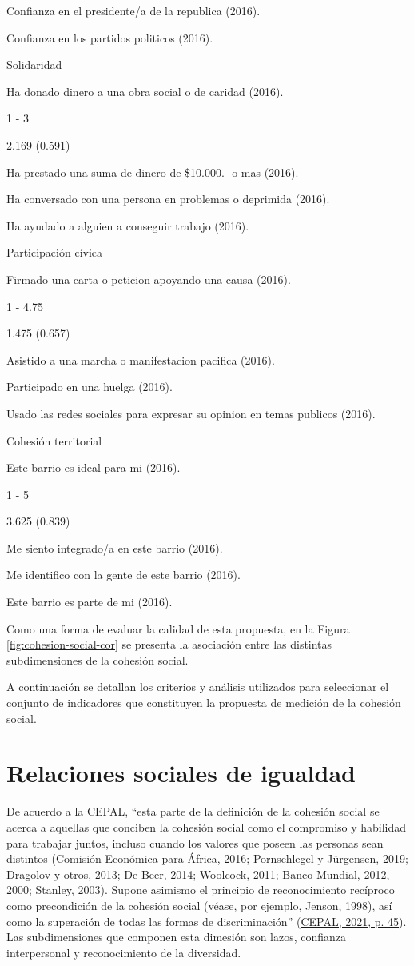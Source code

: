\documentclass[
  12pt,
]{book}
\begin{document}
Confianza en el presidente/a de la republica (2016).

Confianza en los partidos politicos (2016).

Solidaridad

Ha donado dinero a una obra social o de caridad (2016).

1 - 3

2.169 (0.591)

Ha prestado una suma de dinero de \$10.000.- o mas (2016).

Ha conversado con una persona en problemas o deprimida (2016).

Ha ayudado a alguien a conseguir trabajo (2016).

Participación cívica

Firmado una carta o peticion apoyando una causa (2016).

1 - 4.75

1.475 (0.657)

Asistido a una marcha o manifestacion pacifica (2016).

Participado en una huelga (2016).

Usado las redes sociales para expresar su opinion en temas publicos (2016).

Cohesión territorial

Este barrio es ideal para mi (2016).

1 - 5

3.625 (0.839)

Me siento integrado/a en este barrio (2016).

Me identifico con la gente de este barrio (2016).

Este barrio es parte de mi (2016).

Como una forma de evaluar la calidad de esta propuesta, en la Figura \ref{fig:cohesion-social-cor} se presenta la asociación entre las distintas subdimensiones de la cohesión social.

A continuación se detallan los criterios y análisis utilizados para seleccionar el conjunto de indicadores que constituyen la propuesta de medición de la cohesión social.

\hypertarget{relaciones-sociales-de-igualdad}{%
\section{Relaciones sociales de igualdad}\label{relaciones-sociales-de-igualdad}}

De acuerdo a la CEPAL, ``esta parte de la definición de la cohesión social se acerca a aquellas que conciben la cohesión social como el compromiso y habilidad para trabajar juntos, incluso cuando los valores que poseen las personas sean distintos (Comisión Económica para África, 2016; Pornschlegel y Jürgensen, 2019; Dragolov y otros, 2013; De Beer, 2014; Woolcock, 2011; Banco Mundial, 2012, 2000; Stanley, 2003). Supone asimismo el principio de reconocimiento recíproco como precondición de la cohesión social (véase, por ejemplo, Jenson, 1998), así como la superación de todas las formas de discriminación'' (\protect\hyperlink{ref-cepal_cohesion_2021}{CEPAL, 2021, p. 45}). Las subdimensiones que componen esta dimesión son lazos, confianza interpersonal y reconocimiento de la diversidad.
\end{document}

